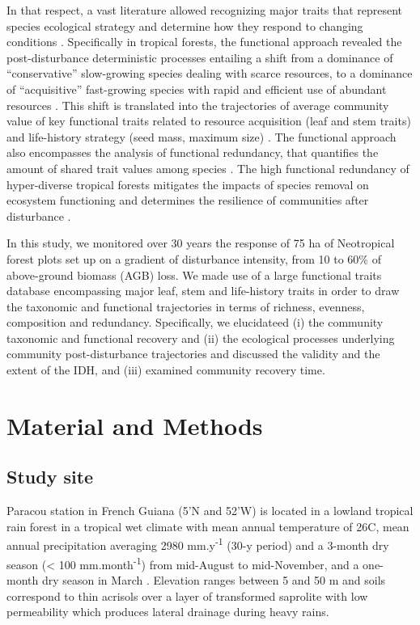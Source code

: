 \documentclass[fleqn,10pt]{ArtEcoFoG} %
\begin{document}
In that respect, a vast literature allowed recognizing major traits that
represent species ecological strategy and determine how they respond to
changing conditions \citep{Diaz2005}. Specifically in tropical forests,
the functional approach revealed the post-disturbance deterministic
processes entailing a shift from a dominance of ``conservative''
slow-growing species dealing with scarce resources, to a dominance of
``acquisitive'' fast-growing species with rapid and efficient use of
abundant resources \citep{Rees2001, Reich2014, Herault2011}. This shift
is translated into the trajectories of average community value of key
functional traits related to resource acquisition (leaf and stem traits)
and life-history strategy (seed mass, maximum size)
\citep{Wright2004, TerSteege2006, Westoby2006a, Chave2009b}. The
functional approach also encompasses the analysis of functional
redundancy, that quantifies the amount of shared trait values among
species \citep{Carmona2016}. The high functional redundancy of
hyper-diverse tropical forests \citep{Bellwood2006} mitigates the
impacts of species removal on ecosystem functioning and determines the
resilience of communities after disturbance
\citep{Elmqvist2003, Diaz2005}.

In this study, we monitored over 30 years the response of 75 ha of
Neotropical forest plots set up on a gradient of disturbance intensity,
from 10 to 60\% of above-ground biomass (AGB) loss. We made use of a
large functional traits database encompassing major leaf, stem and
life-history traits in order to draw the taxonomic and functional
trajectories in terms of richness, evenness, composition and redundancy.
Specifically, we elucidateed (i) the community taxonomic and functional
recovery and (ii) the ecological processes underlying community
post-disturbance trajectories and discussed the validity and the extent
of the IDH, and (iii) examined community recovery time.

\section{Material and Methods}\label{material-and-methods}

\subsection{Study site}\label{study-site}

Paracou station in French Guiana (5'N and
52'W) is located in a lowland tropical rain forest in a
tropical wet climate with mean annual temperature of 26\textdegree C,
mean annual precipitation averaging 2980 mm.y\textsuperscript{-1} (30-y
period) and a 3-month dry season (\textless{} 100
mm.month\textsuperscript{-1}) from mid-August to mid-November, and a
one-month dry season in March \citep{Wagner2011}. Elevation ranges
between 5 and 50 m and soils correspond to thin acrisols over a layer of
transformed saprolite with low permeability which produces lateral
drainage during heavy rains.
\end{document}
